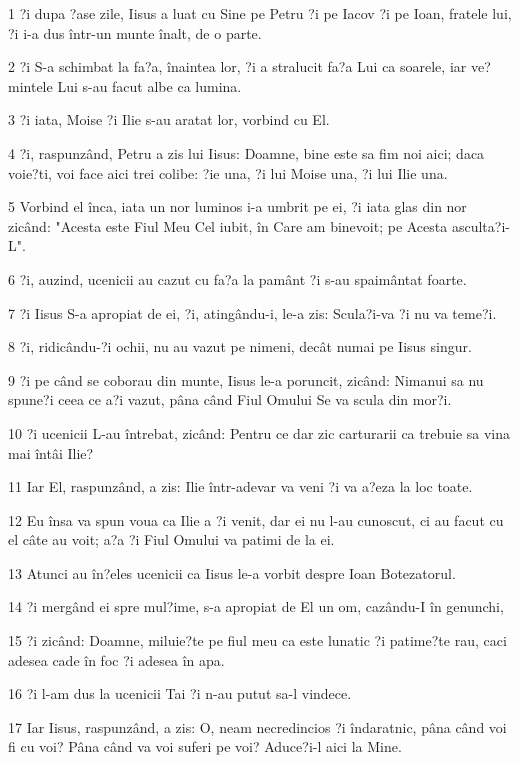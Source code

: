 \par 1 ?i dupa ?ase zile, Iisus a luat cu Sine pe Petru ?i pe Iacov ?i pe Ioan, fratele lui, ?i i-a dus într-un munte înalt, de o parte.
\par 2 ?i S-a schimbat la fa?a, înaintea lor, ?i a stralucit fa?a Lui ca soarele, iar ve?mintele Lui s-au facut albe ca lumina.
\par 3 ?i iata, Moise ?i Ilie s-au aratat lor, vorbind cu El.
\par 4 ?i, raspunzând, Petru a zis lui Iisus: Doamne, bine este sa fim noi aici; daca voie?ti, voi face aici trei colibe: ?ie una, ?i lui Moise una, ?i lui Ilie una.
\par 5 Vorbind el înca, iata un nor luminos i-a umbrit pe ei, ?i iata glas din nor zicând: "Acesta este Fiul Meu Cel iubit, în Care am binevoit; pe Acesta asculta?i-L".
\par 6 ?i, auzind, ucenicii au cazut cu fa?a la pamânt ?i s-au spaimântat foarte.
\par 7 ?i Iisus S-a apropiat de ei, ?i, atingându-i, le-a zis: Scula?i-va ?i nu va teme?i.
\par 8 ?i, ridicându-?i ochii, nu au vazut pe nimeni, decât numai pe Iisus singur.
\par 9 ?i pe când se coborau din munte, Iisus le-a poruncit, zicând: Nimanui sa nu spune?i ceea ce a?i vazut, pâna când Fiul Omului Se va scula din mor?i.
\par 10 ?i ucenicii L-au întrebat, zicând: Pentru ce dar zic carturarii ca trebuie sa vina mai întâi Ilie?
\par 11 Iar El, raspunzând, a zis: Ilie într-adevar va veni ?i va a?eza la loc toate.
\par 12 Eu însa va spun voua ca Ilie a ?i venit, dar ei nu l-au cunoscut, ci au facut cu el câte au voit; a?a ?i Fiul Omului va patimi de la ei.
\par 13 Atunci au în?eles ucenicii ca Iisus le-a vorbit despre Ioan Botezatorul.
\par 14 ?i mergând ei spre mul?ime, s-a apropiat de El un om, cazându-I în genunchi,
\par 15 ?i zicând: Doamne, miluie?te pe fiul meu ca este lunatic ?i patime?te rau, caci adesea cade în foc ?i adesea în apa.
\par 16 ?i l-am dus la ucenicii Tai ?i n-au putut sa-l vindece.
\par 17 Iar Iisus, raspunzând, a zis: O, neam necredincios ?i îndaratnic, pâna când voi fi cu voi? Pâna când va voi suferi pe voi? Aduce?i-l aici la Mine.
